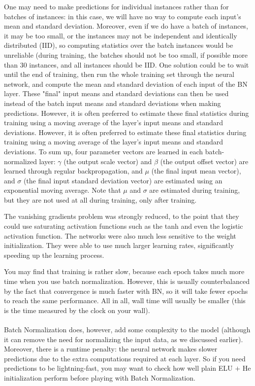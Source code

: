 One may need to make predictions for individual instances rather than for batches of instances: in this case, we will have no way to compute each input's mean and standard deviation. Moreover, even if we do have a batch of instances, it may be too small, or the instances may not be independent and identically distributed (IID), so computing statistics over the batch instances would be unreliable (during training, the batches should not be too small, if possible more than 30 instances, and all instances should be IID.  One solution could be to wait until the end of training, then run the whole training set through the neural network, and compute the mean and standard deviation of each input of the BN layer. These "final" input means and standard deviations can then be used instead of the batch input means and standard deviations when making predictions. However, it is often preferred to estimate these final statistics during training using a moving average of the layer's input means and standard deviations.  However, it is often preferred to estimate these final statistics during training using a moving average of the layer's input means and standard deviations. To sum up, four parameter vectors are learned in each batch-normalized layer: $\gamma$ (the output scale vector) and $\beta$ (the output offset vector) are learned through regular backpropagation, and $\mu$ (the final input mean vector), and $\sigma$ (the final input standard deviation vector) are estimated using an exponential moving average. Note that $\mu$ and $\sigma$ are estimated during training, but they are not used at all during training, only after training.

The vanishing gradients problem was strongly reduced, to the point that they could use saturating activation functions such as the tanh and even the logistic activation function. The networks were also much less sensitive to the weight initialization. They were able to use much larger learning rates, significantly speeding up the learning process.
 
You may find that training is rather slow, because each epoch takes much more time when you use batch normalization. However, this is usually counterbalanced by the fact that convergence is much faster with BN, so it will take fewer epochs to reach the same performance. All in all, wall time will usually be smaller (this is the time measured by the clock on your wall). 
 
\paragraph{} Batch Normalization does, however, add some complexity to the model (although it can remove the need for normalizing the input data, as we discussed earlier). Moreover, there is a runtime penalty: the neural network makes slower predictions due to the extra computations required at each layer. So if you need predictions to be lightning-fast, you may want to check how well plain ELU $+$ He initialization perform before playing with Batch Normalization. 

